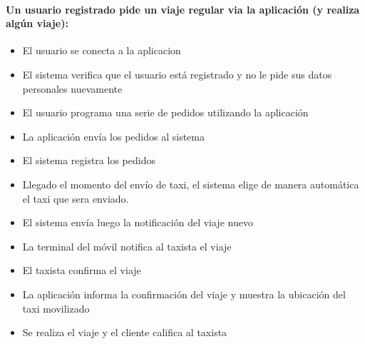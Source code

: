 \documentclass[a4paper]{article}
\begin{document}
\paragraph{Un usuario registrado pide un viaje regular via la aplicaci\'on (y realiza alg\'un viaje):}
\begin{itemize}
\item El usuario se conecta a la aplicacion
\item El sistema verifica que el usuario est\'a registrado y no le pide sus datos personales nuevamente
\item El usuario programa una serie de pedidos utilizando la aplicaci\'on
\item La aplicaci\'on env\'ia los pedidos al sistema
\item El sistema registra los pedidos 
\item Llegado el momento del env\'io de taxi, el sistema elige de manera autom\'atica el taxi que sera enviado.
\item El sistema env\'ia luego la notificaci\'on del viaje nuevo
\item La terminal del m\'ovil notifica al taxista el viaje
\item El taxista confirma el viaje
\item La aplicaci\'on informa la confirmaci\'on del viaje y muestra la ubicaci\'on del taxi movilizado
\item Se realiza el viaje y el cliente califica al taxista
\end{itemize}
\end{document}
